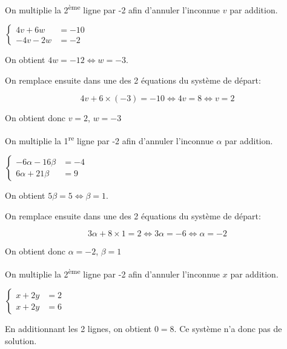 \documentclass[a4paper,12pt]{scrartcl}
\begin{document}
On multiplie la 2\textsuperscript{ème} ligne par -2 afin d'annuler l'inconnue $v$ par addition.

$
\begin{cases}
4v+6w &= -10\\ 
-4v-2w &= -2
\end{cases}$

On obtient $4w = -12 \Leftrightarrow w = -3$.

On remplace ensuite dans une des 2 équations du système de départ:

$$4v + 6 \times (-3) = -10 \Leftrightarrow 4v = 8 \Leftrightarrow v = 2$$

On obtient donc $v=2$, $w=-3$


On multiplie la 1\textsuperscript{re} ligne par -2 afin d'annuler l'inconnue $\alpha$ par addition.

$
\begin{cases}
-6\alpha-16\beta &= -4\\ 
6\alpha+21\beta &= 9
\end{cases}$

On obtient $5\beta = 5 \Leftrightarrow \beta = 1$.

On remplace ensuite dans une des 2 équations du système de départ:

$$3 \alpha + 8 \times 1 = 2 \Leftrightarrow 3 \alpha = -6 \Leftrightarrow \alpha = -2$$

On obtient donc $\alpha=-2$, $\beta=1$


On multiplie la 2\textsuperscript{ème} ligne par -2 afin d'annuler l'inconnue $x$ par addition.

$
\begin{cases}
x+2y &= 2\\ 
x+2y &= 6
\end{cases}$

En additionnant les 2 lignes, on obtient $0 = 8$. Ce système n'a donc pas de solution. 

\end{document}
